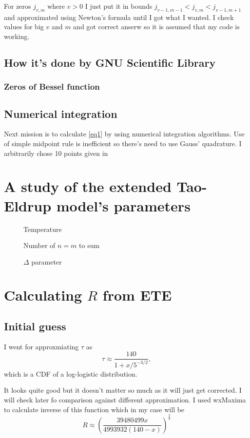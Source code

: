 \documentclass[a4paper]{article}
\begin{document}
	For zeros $j_{v,m}$ where $v > 0$ I just put it in bounds $j_{v-1,m-1} < j_{v,m} < j_{v-1,m+1}$
	\cite[equation 10.21.2]{NIST:DLMF} and approximated using Newton's formula until I got what I wanted. I check values for
	big $v$ and $m$ and got correct anserw so it is assumed that my code is working.
	\subsection{How it's done by GNU Scientific Library}
	\subsubsection{Zeros of Bessel function}
	\subsection{Numerical integration}
	Next mission is to calculate \ref{eq1} by using numerical 
	integration algorithms.
	Use of simple midpoint rule is inefficient so there's need to use Gauss'
	quadrature. I arbitrarily chose 10 points given in \cite[table 3.5.2]{NIST:DLMF}
	\section{A study of the extended Tao-Eldrup model's parameters}
	\begin{figure}[!ht]
	\centering
	\scalebox{.9}{}
	\caption{Temperature}
	\end{figure}
	\begin{figure}[!ht]
	\centering
	\scalebox{.9}{}
	\caption{Number of $n = m$ to sum}
	\end{figure}
	\begin{figure}[!ht]
	\centering
	\scalebox{.9}{}
	\caption{$\Delta$ parameter}
	\end{figure}
	\section{Calculating $R$ from ETE}
	\subsection{Initial guess}
	I went for approxmiating $\tau$ as 
	\begin{equation}
		\tau \approx \frac{140}{1+x/5^{-3/2}},
	\end{equation}
	which is a CDF of a log-logistic distribution.

	It looks quite good but it doesn't matter so much as
	it will just get corrected.
	I will check later fo comparison against different approximation.
	I used wxMaxima to calculate inverse of this function which in my case
	will be 
	\begin{equation}
		R \approx \left(\frac{39480499x}{4993932(140-x)}\right)^{\textstyle\frac{2}{3}}
	\end{equation}
	
	
\end{document}
